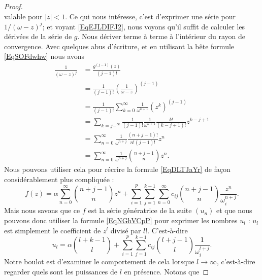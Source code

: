 \begin{proof}
\begin{equation}
    \end{equation}
    valable pour \( | z |<1\). Ce qui nous intéresse, c'est d'exprimer une série pour \( 1/(\omega-z)^j\); et voyant \eqref{EqEJLDIFJ2}, nous voyons qu'il suffit de calculer les dérivées de la série de \( g\). Nous dériver terme à terme à l'intérieur du rayon de convergence. Avec quelques abus d'écriture, et en utilisant la bête formule \eqref{EqSOFdwhw} nous avons
    \begin{subequations}
        \begin{align}
            \frac{1}{ (\omega-z)^j }&=\frac{ g^{(j-1)}(z) }{ (j-1)! }\\
            &=\frac{1}{ (j-1)! }\left( \frac{1}{ \omega-z } \right)^{(j-1)}\\
            &=\frac{1}{ (j-1)! }\sum_{k=0}^{\infty}\frac{1}{ \omega^{k+1} }(z^k)^{(j-1)}\\
            &=\sum_{k=j-^{\infty}}\frac{1}{ (j-1)! }\frac{1}{ \omega^{k+1} }\frac{ k! }{ (k-j+1)! }z^{k-j+1}\\
            &=\sum_{n=0}^{\infty}\frac{1}{ \omega^{n+j} }\frac{ (n+j-1)! }{ n!(j-1)! }z^n\\
            &=\sum_{n=0}^{\infty}\frac{1}{ \omega^{n+j} }{n+j-1\choose n}z^n.
        \end{align}
    \end{subequations}
    Nous pouvons utiliser cela pour récrire la formule \eqref{EqDLTJaYr} de façon considérablement plus compliquée :
    \begin{equation}
            f(z)=\alpha\sum_{n=0}^{\infty}{n+j-1\choose n}z^n
            +\sum_{i=1}^p\sum_{j=1}^{k-1}\sum_{n=0}^{\infty}c_{ij}{n+j-1\choose n}\frac{ z^n }{ \omega_i^{n+j} }.
    \end{equation}
    Mais nous savons que ce \( f\) est la série génératrice de la suite \( (u_n)\) et que nous pouvons donc utiliser la formule \eqref{EqNGhVCpP} pour exprimer les nombres \( u_l\) : \( u_l\) est simplement le coefficient de \( z^l\) divisé par \( l!\). C'est-à-dire
    \begin{equation}
        u_l=\alpha{l+k-1\choose l}+\sum_{i=1}^p\sum_{j=1}^{k-1}c_{ij}{l+j-1\choose l}\frac{1}{ \omega_i^{l+j} }.
    \end{equation}
    Notre boulot est d'examiner le comportement de cela lorsque \( l\to\infty\), c'est-à-dire regarder quels sont les puissances de \( l\) en présence. Notons que


\end{proof}
